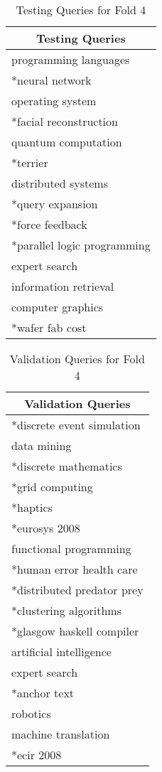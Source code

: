 \begin{table}
\centering
\begin{tabular}{|l|}
\hline \multicolumn{1}{|c|}{\textbf{Testing Queries}} \\
\hline programming languages \\
\hline *neural network \\
\hline operating system \\
\hline *facial reconstruction \\ 
\hline quantum computation \\
\hline *terrier \\ 
\hline distributed systems \\
\hline *query expansion \\ 
\hline *force feedback \\
\hline *parallel logic programming \\ 
\hline expert search \\
\hline information retrieval \\ 
\hline computer graphics \\
\hline *wafer fab cost \\
\hline
\end{tabular}
\caption{Testing Queries for Fold 4} \label{table:fold4testing}
\end{table}

\begin{table}
\centering
\begin{tabular}{|l|}
\hline \multicolumn{1}{|c|}{\textbf{Validation Queries}} \\
\hline *discrete event simulation \\
\hline data mining \\
\hline *discrete mathematics \\
\hline *grid computing \\ 
\hline *haptics \\
\hline *eurosys 2008 \\ 
\hline functional programming \\
\hline *human error health care \\ 
\hline *distributed predator prey \\
\hline *clustering algorithms \\ 
\hline *glasgow haskell compiler \\
\hline artificial intelligence \\ 
\hline expert search \\
\hline *anchor text \\
\hline robotics \\
\hline machine translation \\
\hline *ecir 2008 \\
\hline
\end{tabular}
\caption{Validation Queries for Fold 4} \label{table:fold4validating}
\end{table}

